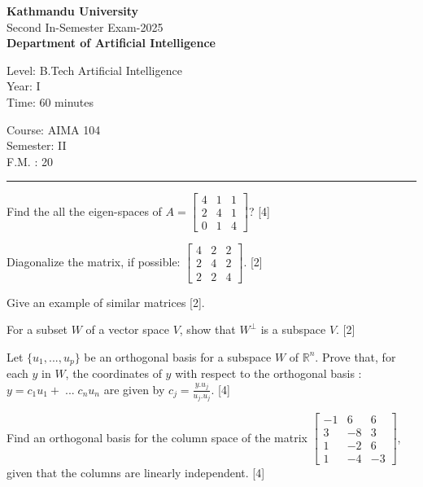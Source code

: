 \documentclass[12pt]{exam}
\begin{document}
\begin{center}
 {\bfseries  {\large Kathmandu University}} \\
 Second In-Semester Exam-2025\\[-1mm]
 {\small \textbf{Department of Artificial Intelligence}}
\end{center}

\begin{minipage}{0.70\linewidth}
  \begin{flushleft}
    Level: B.Tech Artificial Intelligence \\
    Year: I \\
    Time: 60 minutes
  \end{flushleft}
\end{minipage} \hfill
\begin{minipage}{0.25\linewidth}
  \begin{flushleft}
    Course: AIMA 104 \\
    Semester: II \\
    F.M. : 20
  \end{flushleft}
\end{minipage}
\vskip 2mm
\rule{\textwidth}{1pt}
\vskip 2mm
\begin{questions}
\question Find the all the eigen-spaces of $A= \begin{bmatrix}
      4 & 1 & 1 \\
      2 & 4 & 1 \\
      0 & 1 & 4
\end{bmatrix}$? [4]

\question Diagonalize the matrix, if possible: $
   \begin{bmatrix}
     4 & 2 & 2 \\
     2 & 4 & 2 \\
     2 & 2 &4
   \end{bmatrix}
   $. [2]

\question Give an example of similar matrices [2].

\question For a subset $W$ of a vector space $V$, show that $W^{\perp}$ is a subspace $V$. [2]

\question Let $\{u_1, ..., u_p\}$ be an orthogonal basis for a subspace $W$ of $\mathbb{R}^n$. Prove that, for each $y$ in $W$, the coordinates of $y$ with respect to the orthogonal basis : $y = c_1u_1 + \; ... \; c_n u_n$ are given by $\displaystyle c_j = \frac{y.u_j}{u_j.u_j}$. [4]

\question Find an orthogonal basis for the column space of the matrix $\begin{bmatrix}
      -1 & 6 & 6 \\
      3 & -8 & 3 \\
      1 & -2 & 6 \\
      1 & -4 & -3
    \end{bmatrix}$, given that the columns are linearly independent. [4]
\end{questions}
\end{document}
